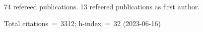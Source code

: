 74 refereed publications. 13 refeered publications as first author.

Total citations~=~3312; h-index~=~32 (2023-06-16)